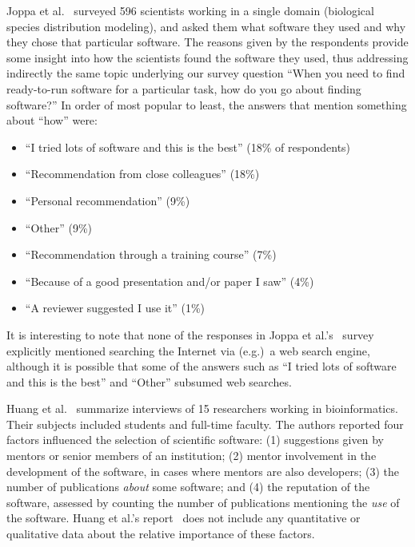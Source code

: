 \documentclass{casicswhitepaper}
\begin{document}
Joppa et al.~\cite{joppa2013troubling} surveyed 596 scientists working in a single domain (biological species distribution modeling), and asked them what software they used and why they chose that particular software.  The reasons given by the respondents provide some insight into how the scientists found the software they used, thus addressing indirectly the same topic underlying our survey question ``When you need to find ready-to-run software for a particular task, how do you go about finding software?''  In order of most popular to least, the answers that mention something about ``how'' were:
\begin{itemize}[itemsep=0ex]

\item ``I tried lots of software and this is the best'' (18\% of respondents)
\item ``Recommendation from close colleagues'' (18\%)
\item ``Personal recommendation'' (9\%)
\item ``Other'' (9\%)
\item ``Recommendation through a training course'' (7\%)
\item ``Because of a good presentation and/or paper I saw'' (4\%)
\item ``A reviewer suggested I use it'' (1\%)

\end{itemize}

It is interesting to note that none of the responses in Joppa et al.'s~\cite{joppa2013troubling} survey explicitly mentioned searching the Internet via (e.g.)\ a web search engine, although it is possible that some of the answers such as ``I tried lots of software and this is the best'' and ``Other'' subsumed web searches.

Huang et al.~\cite{huang2013provenance} summarize interviews of 15 researchers working in bioinformatics.  Their subjects included students and full-time faculty.  The authors reported four factors influenced the selection of scientific software: (1) suggestions given by mentors or senior members of an institution; (2) mentor involvement in the development of the software, in cases where mentors are also developers; (3) the number of publications \emph{about} some software; and (4) the reputation of the software, assessed by counting the number of publications mentioning the \emph{use} of the software.  Huang et al.'s report~\cite{huang2013provenance} does not include any quantitative or qualitative data about the relative importance of these factors.
\end{document}
